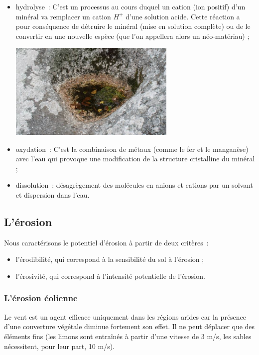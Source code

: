 \documentclass[a4paper,11pt]{article}
\begin{document}
\begin{itemize}
  \item hydrolyse~: C'est un processus au cours duquel un cation (ion positif) d'un minéral va remplacer un cation $H^+$ d'une solution acide.
  Cette réaction a pour conséquence de détruire le minéral (mise en solution complète) ou de le convertir en une nouvelle espèce (que l'on appellera alors un néo-matériau) ;
  \medbreak
  \begin{center}
    \includegraphics[width=8cm]{Images/Erosion/hydrolyse.jpg}
  \end{center}
  \medbreak
  \item oxydation~: C'est la combinaison de métaux (comme le fer et le manganèse) avec l'eau qui provoque une modification de la structure cristalline du minéral ;
  \item dissolution~: désagrègement des molécules en anions et cations par un solvant et dispersion dans l'eau.
\end{itemize}

\subsection{L'érosion}

Nous caractérisons le potentiel d'érosion à partir de deux critères~:
\begin{itemize}
  \item l'érodibilité, qui correspond à la sensibilité du sol à l'érosion ;
  \item l'érosivité, qui correspond à l'intensité potentielle de l'érosion.
\end{itemize}

\subsubsection{L'érosion éolienne}

Le vent est un agent efficace uniquement dans les régions arides car la présence d'une couverture végétale diminue fortement son effet.
Il ne peut déplacer que des éléments fins (les limons sont entraînés à partir d'une vitesse de 3 m/s, les sables nécessitent, pour leur part, 10 m/s).
\end{document}
